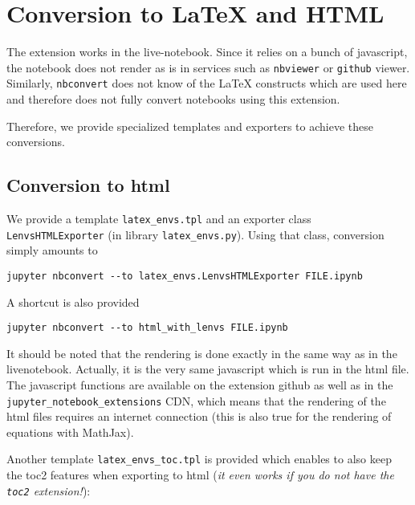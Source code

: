     \section{Conversion to LaTeX and
HTML}\label{conversion-to-latex-and-html}

    The extension works in the live-notebook. Since it relies on a bunch of
javascript, the notebook does not render as is in services such as
\texttt{nbviewer} or \texttt{github} viewer. Similarly,
\texttt{nbconvert} does not know of the LaTeX constructs which are used
here and therefore does not fully convert notebooks using this
extension.

Therefore, we provide specialized templates and exporters to achieve
these conversions.

    \subsection{Conversion to html}\label{conversion-to-html}

We provide a template \texttt{latex\_envs.tpl} and an exporter class
\texttt{LenvsHTMLExporter} (in library \texttt{latex\_envs.py}). Using
that class, conversion simply amounts to

\begin{verbatim}
jupyter nbconvert --to latex_envs.LenvsHTMLExporter FILE.ipynb
\end{verbatim}

A shortcut is also provided

\begin{verbatim}
jupyter nbconvert --to html_with_lenvs FILE.ipynb
\end{verbatim}

It should be noted that the rendering is done exactly in the same way as
in the livenotebook. Actually, it is the very same javascript which is
run in the html file. The javascript functions are available on the
extension github as well as in the
\texttt{jupyter\_notebook\_extensions} CDN, which means that the
rendering of the html files requires an internet connection (this is
also true for the rendering of equations with MathJax).

Another template \texttt{latex\_envs\_toc.tpl} is provided which enables
to also keep the toc2 features when exporting to html (\emph{it even
works if you do not have the \texttt{toc2} extension!}):

\begin{Shaded}
\begin{Highlighting}[]
 
\end{Highlighting}
\end{Shaded}


